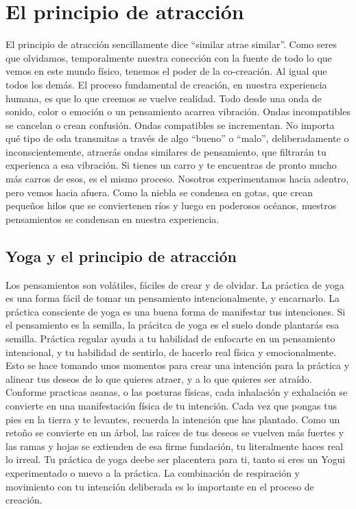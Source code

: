 \section{El principio de atracción}
El principio de atracción sencillamente dice ``similar atrae similar''. Como seres que olvidamos, temporalmente nuestra conección con la fuente de todo lo que vemos en este mundo físico, tenemos el poder de la co-creación. Al igual que todos los demás. El proceso fundamental de creación, en nuestra experiencia humana, es que lo que creemos se vuelve realidad. Todo desde una onda de sonido, color o emoción o un pensamiento acarrea vibración. Ondas incompatibles se cancelan o crean confusión. Ondas compatibles se incrementan. No importa qu\'e tipo de oda transmitas a trav\'es de algo ``bueno'' o ``malo'', deliberadamente o inconscientemente, atraerás ondas similares de pensamiento, que filtrarán tu experienca a esa vibración. Si tienes un carro y te encuentras de pronto mucho más carros de esos, es el mismo proceso. Nosotros experimentamos hacia adentro, pero vemos hacia afuera. Como la niebla se condensa en gotas, que crean pequeños hilos que se conviertenen ríos y luego en poderosos oc\'eanos, nuestros pensamientos se condensan en nuestra experiencia.

\subsection{Yoga y el principio de atracción}
Los pensamientos son volátiles, fáciles de crear y de olvidar. La práctica de yoga es una forma fácil de tomar un pensamiento intencionalmente, y encarnarlo. La práctica consciente de yoga es una buena forma de manifestar tus intenciones. Si el pensamiento es la semilla, la prácitca de yoga es el suelo donde plantarás esa semilla. Práctica regular ayuda a tu habilidad de enfocarte en un pensamiento intencional, y tu habilidad de sentirlo, de hacerlo real física y emocionalmente. Esto se hace tomando unos momentos para crear una intención para la práctica y alinear tus deseos de lo que quieres atraer, y a lo que quieres ser atraído. Conforme practicas asanas, o las posturas físicas, cada inhalación y exhalación se convierte en una manifestación física de tu intención. Cada vez que pongas tus pies en la tierra y te levantes, recuerda la intención que has plantado. Como un retoño se convierte en un árbol, las raíces de tus deseos se vuelven más fuertes y las ramas y hojas se extienden de esa firme fundación, tu literalmente haces real lo irreal. Tu práctica de yoga deebe ser placentera para ti, tanto si eres un Yogui experimentado o nuevo a la práctica. La combinación de respiración y movimiento con tu intención deliberada es lo importante en el proceso de creación.

